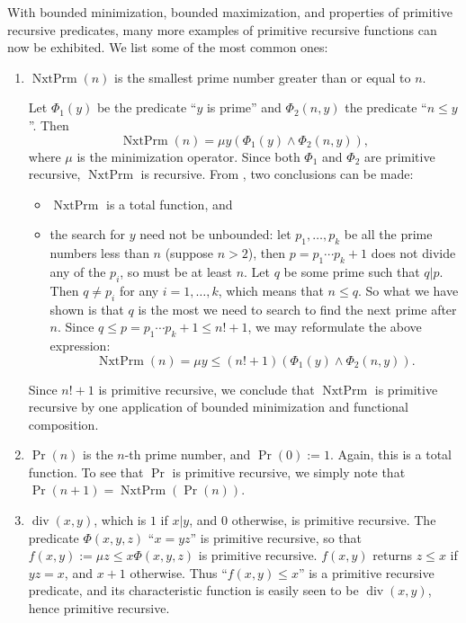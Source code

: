 \documentclass[12pt]{article}
\begin{document}
With bounded minimization, bounded maximization, and properties of primitive recursive predicates, many more examples of primitive recursive functions can now be exhibited.  We list some of the most common ones:

\begin{enumerate}
\item $\operatorname{NxtPrm}(n)$ is the smallest prime number greater than or equal to $n$.

Let $\Phi_1(y)$ be the predicate ``$y$ is prime'' and $\Phi_2(n,y)$ the predicate ``$n\le y$''.  Then $$\operatorname{NxtPrm}(n) = \mu y (\Phi_1(y) \wedge \Phi_2(n,y)),$$
where $\mu$ is the minimization operator.  Since both $\Phi_1$ and $\Phi_2$ are primitive recursive, $\operatorname{NxtPrm}$ is recursive.  From , two conclusions can be made:
\begin{itemize}
\item $\operatorname{NxtPrm}$ is a total function, and 
\item the search for $y$ need not be unbounded: let $p_1,\ldots,p_k$ be all the prime numbers less than $n$ (suppose $n>2$), then $p=p_1\cdots p_k +1$ does not divide any of the $p_i$, so must be at least $n$.  Let $q$ be some prime such that $q|p$.  Then $q\ne p_i$ for any $i=1,\ldots, k$, which means that $n\le q$.  So what we have shown is that $q$ is the most we need to search to find the next prime after $n$.  Since $q\le p=p_1\cdots p_k+1 \le n! +1$, we may reformulate the above expression:
$$\operatorname{NxtPrm}(n) = \mu y \le (n! +1)  (\Phi_1(y) \wedge \Phi_2(n,y)).$$
\end{itemize}
Since $n!+1$ is primitive recursive, we conclude that $\operatorname{NxtPrm}$ is primitive recursive by one application of bounded minimization and functional composition.
\item $\operatorname{Pr}(n)$ is the $n$-th prime number, and $\operatorname{Pr}(0):=1$.  Again, this is a total function.  To see that $\operatorname{Pr}$ is primitive recursive, we simply note that $\operatorname{Pr}(n+1)=\operatorname{NxtPrm}(\operatorname{Pr}(n))$.
\item $\operatorname{div}(x,y)$, which is $1$ if $x|y$, and $0$ otherwise, is primitive recursive.  The predicate $\Phi(x,y,z)$ ``$x=yz$'' is primitive recursive, so that $f(x,y):=\mu z \le x \Phi(x,y,z)$ is primitive recursive.  $f(x,y)$ returns $z\le x$ if $yz=x$, and $x+1$ otherwise.  Thus ``$f(x,y) \le x$'' is a primitive recursive predicate, and its characteristic function is easily seen to be $\operatorname{div}(x,y)$, hence primitive recursive.


\end{enumerate}
\end{document}
